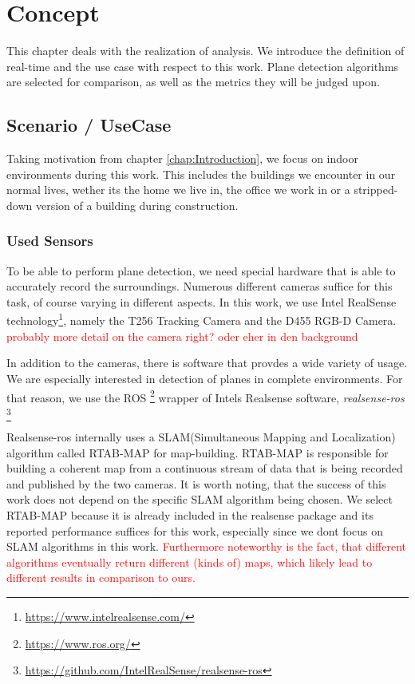 \documentclass[main.tex]{subfiles}
\begin{document}
\chapter{Concept} \label{chap:Concept}


This chapter deals with the realization of analysis.
We introduce the definition of real-time and the use case with respect to this work.
Plane detection algorithms are selected for comparison, as well as the metrics they will be judged upon.

\section{Scenario / UseCase}
Taking motivation from chapter \ref{chap:Introduction}, we focus on indoor environments during this work.
This includes the buildings we encounter in our normal lives, wether its the home we live in, the office we work in or a stripped-down
version of a building during construction.


\subsection{Used Sensors}
To be able to perform plane detection, we need special hardware that is able to accurately record the surroundings.
Numerous different cameras suffice for this task, of course varying in different aspects.
In this work, we use Intel RealSense technology\footnote{\href{https://www.intelrealsense.com/}{https://www.intelrealsense.com/}}, namely the T256 Tracking Camera and the D455 RGB-D Camera.
\textcolor{red}{probably more detail on the camera right? oder eher in den background}


In addition to the cameras, there is software that provdes a wide variety of usage. We are especially interested in detection of planes
in complete environments. For that reason, we use the ROS \footnote{\href{https://www.ros.org/}{https://www.ros.org/}} wrapper of
Intels Realsense software, \textit{realsense-ros} \footnote{\href{https://github.com/IntelRealSense/realsense-ros}{https://github.com/IntelRealSense/realsense-ros}}

Realsense-ros internally uses a SLAM(Simultaneous Mapping and Localization) algorithm called RTAB-MAP \cite{Labbé_Michaud_2019} for map-building.
RTAB-MAP is responsible for building a coherent map from a continuous stream of data that is being recorded and published by the two cameras.
It is worth noting, that the success of this work does not depend on the specific SLAM algorithm being chosen. We select RTAB-MAP because
it is already included in the realsense package and its reported performance suffices for this work, especially since we dont focus on SLAM
algorithms in this work.
\textcolor{red} {Furthermore noteworthy is the fact, that different algorithms eventually return different (kinds of) maps, which likely lead to different results in
    comparison to ours.}
\end{document}
